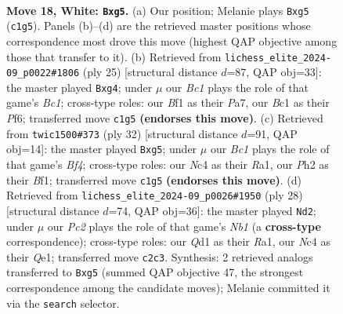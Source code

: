 \documentclass[11pt]{article}
\begin{document}
\begin{figure}[p]
\label{fig:thought-m32}
\end{figure}

\clearpage

\begin{figure}[p]\centering
\begin{subfigure}{0.46\textwidth}\centering
\resizebox{\linewidth}{!}{%
\newchessgame
\chessboard[
  setfen={1rb2qk1/p1pp1ppp/8/6b1/1pNPn3/1P6/P1P2P1P/1RBQ1BK1 w - - 2 18},
  showmover=false,
  pgfstyle=straightmove, color=movearrow, markmove={c1-g5}
]}
\caption{}
\end{subfigure}\hfill
\begin{subfigure}{0.46\textwidth}\centering
\resizebox{\linewidth}{!}{%
\newchessgame
\chessboard[
  setfen={r1bq2k1/ppp3pp/2pn1p2/8/6N1/2PP3P/P1P2PP1/R1B1Q1K1 b - - 0 13},
  showmover=false,
  pgfstyle=straightmove, color=movearrow, markmove={c8-g4}
]}
\caption{}
\end{subfigure}
\\[4pt]
\begin{subfigure}{0.46\textwidth}\centering
\resizebox{\linewidth}{!}{%
\newchessgame
\chessboard[
  setfen={r2q2k1/pp1b1ppp/2p5/P2p1nb1/3P1B2/2P5/1P1N1PPP/R3QBK1 w - - 3 17},
  showmover=false,
  pgfstyle=straightmove, color=movearrow, markmove={f4-g5}
]}
\caption{}
\end{subfigure}\hfill
\begin{subfigure}{0.46\textwidth}\centering
\resizebox{\linewidth}{!}{%
\newchessgame
\chessboard[
  setfen={r2q2k1/pppb1ppp/3p1b2/5n2/3P1B2/2P4P/PP3PP1/RN2QBK1 w - - 1 15},
  showmover=false,
  pgfstyle=straightmove, color=movearrow, markmove={b1-d2}
]}
\caption{}
\end{subfigure}
\caption{\textbf{Move 18, White: \texttt{Bxg5}.} (a) Our position; Melanie plays \texttt{Bxg5} (\texttt{c1g5}). Panels (b)--(d) are the retrieved master positions whose correspondence most drove this move (highest QAP objective among those that transfer to it). (b) Retrieved from \texttt{lichess\_elite\_2024-09\_p0022\#1806} (ply 25) [structural distance $d$=87, QAP obj=33]: the master played \texttt{Bxg4}; under $\mu$ our \emph{Bc1} plays the role of that game's \emph{Bc1}; cross-type roles: our \emph{B}f1 as their \emph{P}a7, our \emph{B}c1 as their \emph{P}f6; transferred move \texttt{c1g5} \textbf{(endorses this move)}. (c) Retrieved from \texttt{twic1500\#373} (ply 32) [structural distance $d$=91, QAP obj=14]: the master played \texttt{Bxg5}; under $\mu$ our \emph{Bc1} plays the role of that game's \emph{Bf4}; cross-type roles: our \emph{N}c4 as their \emph{R}a1, our \emph{P}h2 as their \emph{B}f1; transferred move \texttt{c1g5} \textbf{(endorses this move)}. (d) Retrieved from \texttt{lichess\_elite\_2024-09\_p0026\#1950} (ply 28) [structural distance $d$=74, QAP obj=36]: the master played \texttt{Nd2}; under $\mu$ our \emph{Pc2} plays the role of that game's \emph{Nb1} (a \textbf{cross-type} correspondence); cross-type roles: our \emph{Q}d1 as their \emph{R}a1, our \emph{N}c4 as their \emph{Q}e1; transferred move \texttt{c2c3}. Synthesis: 2 retrieved analogs transferred to \texttt{Bxg5} (summed QAP objective 47, the strongest correspondence among the candidate moves); Melanie committed it via the \texttt{search} selector.}

\end{figure}
\end{document}
